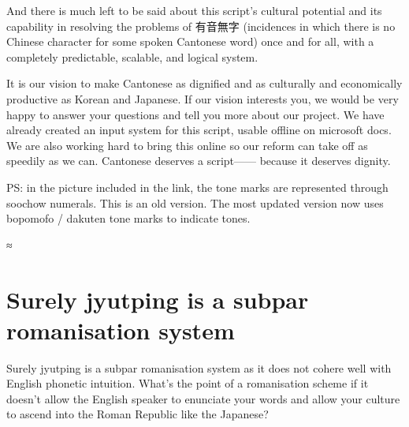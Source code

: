 And there is much left to be said about this script’s cultural potential and its capability in resolving the problems of 有音無字 (incidences in which there is no Chinese character for some spoken Cantonese word) once and for all, with a completely predictable, scalable, and logical system.

It is our vision to make Cantonese as dignified and as culturally and economically productive as Korean and Japanese. If our vision interests you, we would be very happy to answer your questions and tell you more about our project. We have already created an input system for this script, usable offline on microsoft docs. We are also working hard to bring this online so our reform can take off as speedily as we can. Cantonese deserves a script—— because it deserves dignity.

PS: in the picture included in the link, the tone marks are represented through soochow numerals. This is an old version. The most updated version now uses bopomofo / dakuten tone marks to indicate tones.

≈%




\section{Surely jyutping is a subpar romanisation system}
Surely jyutping is a subpar romanisation system as it does not cohere well with English phonetic intuition. What’s the point of a romanisation scheme if it doesn’t allow the English speaker to enunciate your words and allow your culture to ascend into the Roman Republic like the Japanese?


